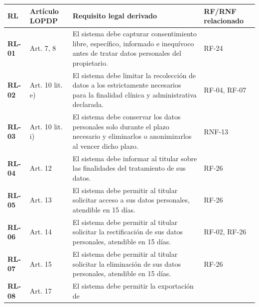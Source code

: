 \documentclass[
]{article}
\newcounter{none} %
\begin{document}
{\def\LTcaptype{none} %
\begin{longtable}[]{|
  >{\raggedright\arraybackslash}p{}|
  >{\raggedright\arraybackslash}p{}|
  >{\raggedright\arraybackslash}p{}|
  >{\raggedright\arraybackslash}p{}|}
\hline
\begin{minipage}[b]{\linewidth}\raggedright
\textbf{RL}
\end{minipage} & \begin{minipage}[b]{\linewidth}\raggedright
\textbf{Artículo LOPDP}
\end{minipage} & \begin{minipage}[b]{\linewidth}\raggedright
\textbf{Requisito legal derivado}
\end{minipage} & \begin{minipage}[b]{\linewidth}\raggedright
\textbf{RF/RNF relacionado}
\end{minipage} \\
\hline
\endhead
\hline
\endlastfoot
\textbf{RL-01} & Art. 7, 8 & El sistema debe capturar consentimiento
libre, específico, informado e inequívoco antes de tratar datos
personales del propietario. & RF-24 \\
\hline
\textbf{RL-02} & Art. 10 lit. e) & El sistema debe limitar la
recolección de datos a los estrictamente necesarios para la finalidad
clínica y administrativa declarada. & RF-04, RF-07 \\
\hline
\textbf{RL-03} & Art. 10 lit. i) & El sistema debe conservar los datos
personales solo durante el plazo necesario y eliminarlos o anonimizarlos
al vencer dicho plazo. & RNF-13 \\
\hline
\textbf{RL-04} & Art. 12 & El sistema debe informar al titular sobre las
finalidades del tratamiento de sus datos. & RF-26 \\
\hline
\textbf{RL-05} & Art. 13 & El sistema debe permitir al titular solicitar
acceso a sus datos personales, atendible en 15 días. & RF-26 \\
\hline
\textbf{RL-06} & Art. 14 & El sistema debe permitir al titular solicitar
la rectificación de sus datos personales, atendible en 15 días. & RF-02,
RF-26 \\
\hline
\textbf{RL-07} & Art. 15 & El sistema debe permitir al titular solicitar
la eliminación de sus datos personales, atendible en 15 días. & RF-26 \\
\hline
\textbf{RL-08} & Art. 17 & El sistema debe permitir la exportación de

\end{longtable}}
\end{document}
